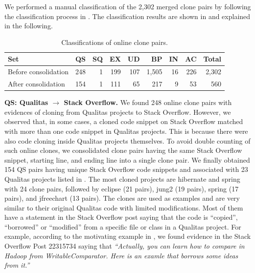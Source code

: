 \documentclass[10pt,journal,compsoc]{IEEEtran}
\begin{document}
We performed a manual classification
of the 2,302 merged clone pairs by following the classification process
in . 
The classification results are shown in  
and explained in the following.

\begin{table}
	\centering
	\caption{Classifications of online clone pairs.}
	\label{tab:classification_good_o}
	\begin{tabular}{lrrrrrrrr}
		\toprule
		Set & QS & SQ & EX & UD & BP & IN & AC & Total \\ 
		\midrule
		Before consolidation & 248 & 1 & 199 & 107 & 1,505 & 16 & 226 & 2,302 \\
		After consolidation & 154 & 1 & 111 & 65 & 217 & 9 & 53 & 560 \\
		\bottomrule
	\end{tabular} 
\end{table}

\textbf{QS: Qualitas $\rightarrow$ Stack Overflow.} We found 248 online clone
pairs with evidences of cloning from Qualitas projects to Stack Overflow.
However, we observed that, in some cases, a cloned code snippet on Stack
Overflow matched with more than one code snippet in Qualitas projects. This is
because there were also code cloning inside Qualitas projects themselves. To
avoid double counting of such online clones, we consolidated clone pairs having
the same Stack Overflow snippet, starting line, and ending line into a single
clone pair. We finally obtained 154 QS pairs having unique Stack Overflow code
snippets and associated with 23 Qualitas projects listed in
. The most cloned projects are \textsf{hibernate}
and \textsf{spring} with 24 clone pairs, followed by \textsf{eclipse} (21
pairs), \textsf{jung2} (19 pairs), \textsf{spring} (17 pairs), and
\textsf{jfreechart} (13 pairs). The clones are used as examples and are very
similar to their original Qualitas code with limited modifications. Most of them
have a statement in the Stack Overflow post saying that the code is ``copied'',
``borrowed'' or ``modified'' from a specific file or class in a Qualitas
project. For example, according to the motivating example in
, we found evidence in the Stack Overflow Post 22315734
saying that \textit{``Actually, you can learn how to compare in Hadoop from
	WritableComparator. Here is an examle that borrows some ideas from it.''}
\end{document}
